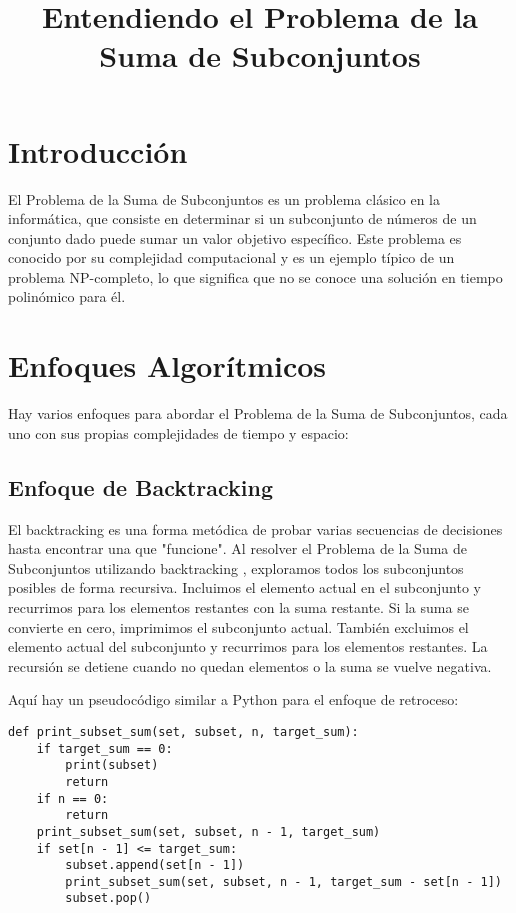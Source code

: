 \documentclass{article}
\title{Entendiendo el Problema de la Suma de Subconjuntos}
\author{}
\date{}
\begin{document}
\maketitle

\section{Introducción}
El Problema de la Suma de Subconjuntos es un problema clásico en la informática, que consiste en determinar si un subconjunto de números de un conjunto dado puede sumar un valor objetivo específico. Este problema es conocido por su complejidad computacional y es un ejemplo típico de un problema NP-completo, lo que significa que no se conoce una solución en tiempo polinómico para él.

\section{Enfoques Algorítmicos}
Hay varios enfoques para abordar el Problema de la Suma de Subconjuntos, cada uno con sus propias complejidades de tiempo y espacio:

\subsection{Enfoque de Backtracking }
El backtracking  es una forma metódica de probar varias secuencias de decisiones hasta encontrar una que "funcione". Al resolver el Problema de la Suma de Subconjuntos utilizando backtracking , exploramos todos los subconjuntos posibles de forma recursiva. Incluimos el elemento actual en el subconjunto y recurrimos para los elementos restantes con la suma restante. Si la suma se convierte en cero, imprimimos el subconjunto actual. También excluimos el elemento actual del subconjunto y recurrimos para los elementos restantes. La recursión se detiene cuando no quedan elementos o la suma se vuelve negativa.

Aquí hay un pseudocódigo similar a Python para el enfoque de retroceso:

\begin{verbatim}
def print_subset_sum(set, subset, n, target_sum):
    if target_sum == 0:
        print(subset)
        return
    if n == 0:
        return
    print_subset_sum(set, subset, n - 1, target_sum)
    if set[n - 1] <= target_sum:
        subset.append(set[n - 1])
        print_subset_sum(set, subset, n - 1, target_sum - set[n - 1])
        subset.pop()
\end{verbatim}
\end{document}
